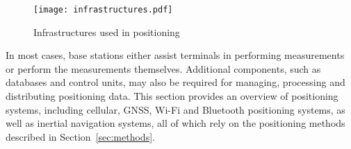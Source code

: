 \begin{figure}[htbp] 
    \centering 
    \texttt{[image: infrastructures.pdf]} 
    \caption{Infrastructures used in positioning \cite{kupper2005location}} 
    \label{fig:infrastructures} 
\end{figure}

In most cases, base stations either assist terminals in performing measurements or perform the measurements themselves. 
Additional components, such as databases and control units, may also be required for managing, processing and distributing positioning data. 
This section provides an overview of positioning systems, including cellular, \acs{GNSS}, \ac{Wi-Fi} and Bluetooth positioning systems, as well as inertial navigation systems, all of which rely on the positioning methods described in Section~\ref{sec:methods}.



